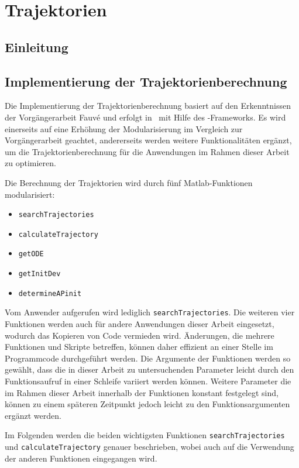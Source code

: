 \chapter{Trajektorien}\label{cha:trj}

\section{Einleitung}

\section{Implementierung der Trajektorienberechnung}

Die Implementierung der Trajektorienberechnung basiert auf den Erkenntnissen der Vorgängerarbeit Fauvé \cite{fauve} und erfolgt in \Matlab\ mit Hilfe des \casadi-Frameworks. Es wird einerseits auf eine Erhöhung der Modularisierung im Vergleich zur Vorgängerarbeit geachtet, andererseits werden weitere Funktionalitäten ergänzt, um die Trajektorienberechnung für die Anwendungen im Rahmen dieser Arbeit zu optimieren.

Die Berechnung der Trajektorien wird durch fünf Matlab-Funktionen modularisiert:
\begin{itemize}
	\item \texttt{searchTrajectories}
	\item \texttt{calculateTrajectory}
	\item \texttt{getODE}
	\item \texttt{getInitDev}
	\item \texttt{determineAPinit}
\end{itemize}

Vom Anwender aufgerufen wird lediglich \texttt{searchTrajectories}. Die weiteren vier Funktionen werden auch für andere Anwendungen dieser Arbeit eingesetzt, wodurch das Kopieren von Code vermieden wird. Änderungen, die mehrere Funktionen und Skripte betreffen, können daher effizient an einer Stelle im Programmcode durchgeführt werden. Die Argumente der Funktionen werden so gewählt, dass die in dieser Arbeit zu untersuchenden Parameter leicht durch den Funktionsaufruf in einer Schleife variiert werden können. Weitere Parameter die im Rahmen dieser Arbeit innerhalb der Funktionen konstant festgelegt sind, können zu einem späteren Zeitpunkt jedoch leicht zu den Funktionsargumenten ergänzt werden.

Im Folgenden werden die beiden wichtigsten Funktionen \texttt{searchTrajectories} und \texttt{calculateTrajectory} genauer beschrieben, wobei auch auf die Verwendung der anderen Funktionen eingegangen wird.




